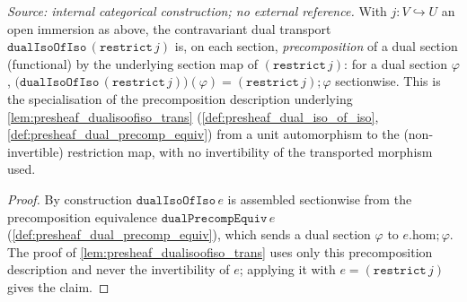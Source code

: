 \begin{lemma}
  \label{lem:dualisoofiso_restrict_precomp_apply}
  \textit{Source: internal categorical construction; no external reference.}
  With \(j : V \hookrightarrow U\) an open immersion as above, the contravariant dual transport
  \(\mathtt{dualIsoOfIso}\,(\mathtt{restrict}\,j)\) is, on each section, \emph{precomposition} of a
  dual section (functional) by the underlying section map of \((\mathtt{restrict}\,j)\): for a dual
  section \(\varphi\), \(\bigl(\mathtt{dualIsoOfIso}\,(\mathtt{restrict}\,j)\bigr)(\varphi)
  = (\mathtt{restrict}\,j) \mathbin{;} \varphi\) sectionwise. This is the specialisation of the
  precomposition description underlying \cref{lem:presheaf_dualisoofiso_trans}
  (\cref{def:presheaf_dual_iso_of_iso}, \cref{def:presheaf_dual_precomp_equiv}) from a unit
  automorphism to the (non-invertible) restriction map, with no invertibility of the transported
  morphism used.
\end{lemma}
\begin{proof}
  By construction \(\mathtt{dualIsoOfIso}\,e\) is assembled sectionwise from the precomposition
  equivalence \(\mathtt{dualPrecompEquiv}\,e\) (\cref{def:presheaf_dual_precomp_equiv}), which sends
  a dual section \(\varphi\) to \(e.\mathrm{hom} \mathbin{;} \varphi\). The proof of
  \cref{lem:presheaf_dualisoofiso_trans} uses only this precomposition description and never the
  invertibility of \(e\); applying it with \(e = (\mathtt{restrict}\,j)\) gives the claim.
\end{proof}

